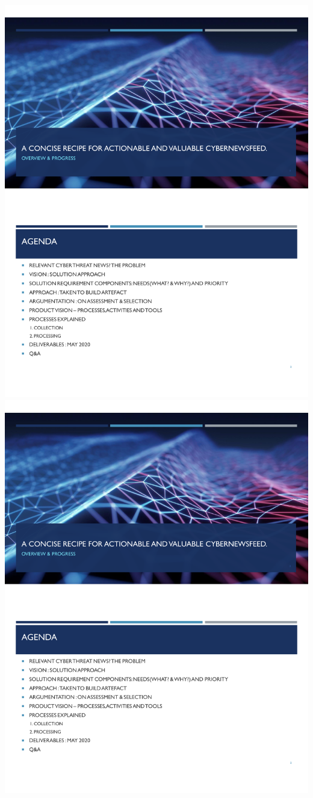 \includegraphics[page=2,scale=0.75]{Appendices/Threat-Brief-Product-Jeroen-jean.pdf} 
\includegraphics[page=3,scale=0.75]{Appendices/Threat-Brief-Product-Jeroen-jean.pdf} 
